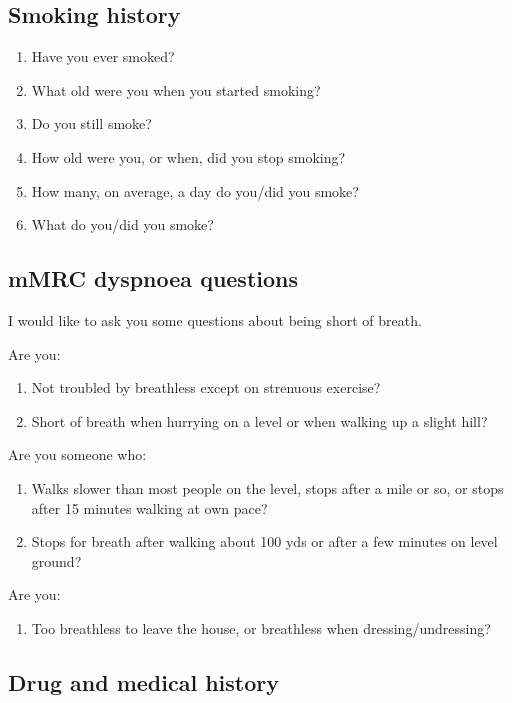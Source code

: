 \documentclass[a4paper,10pt]{article}
\begin{document}
\subsection{Smoking history}

\begin{enumerate}
\item Have you ever smoked?
\item What old were you when you started smoking?
\item Do you still smoke?
\item How old were you, or when, did you stop smoking?
\item How many, on average, a day do you/did you smoke?
\item What do you/did you smoke?
\end{enumerate}

\subsection{mMRC dyspnoea questions} 

I would like to ask you some questions about being short of breath.

Are you:

\begin{enumerate}
\item Not troubled by breathless except on strenuous exercise?
\item Short of breath when hurrying on a level or when walking up a slight hill?
\end{enumerate}

Are you someone who:

\begin{enumerate}[resume]
\item Walks slower than most people on the level, stops after a mile or so, or stops after 15 minutes walking at own pace?
\item Stops for breath after walking about 100 yds or after a few minutes on level ground?
\end{enumerate}

Are you:

\begin{enumerate}[resume]
\item Too breathless to leave the house, or breathless when dressing/undressing?
\end{enumerate}

\subsection{Drug and medical history}
\end{document}
